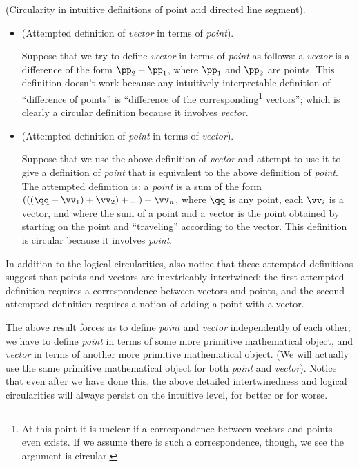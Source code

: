 \begin{remark}
    (Circularity in intuitive definitions of point and directed line segment).
        
    \begin{itemize}
        \item (Attempted definition of \textit{vector} in terms of \textit{point}). 
        
        Suppose that we try to define \textit{vector} in terms of \textit{point} as follows: a \textit{vector} is a difference of the form $\pp_2 - \pp_1$, where $\pp_1$ and $\pp_2$ are points. This definition doesn't work because any intuitively interpretable definition of ``difference of points'' is ``difference of the corresponding\footnote{At this point it is unclear if a correspondence between vectors and points even exists. If we assume there is such a correspondence, though, we see the argument is circular.} vectors''; which is clearly a circular definition because it involves \textit{vector}.
        
        \item (Attempted definition of \textit{point} in terms of \textit{vector}). 
        
        Suppose that we use the above definition of \textit{vector} and attempt to use it to give a definition of \textit{point} that is equivalent to the above definition of \textit{point}. The attempted definition is: a \textit{point} is a sum of the form $(((\qq + \vv_1) + \vv_2) + ...) + \vv_n$, where $\qq$ is any point, each $\vv_i$ is a vector, and where the sum of a point and a vector is the point obtained by starting on the point and ``traveling'' according to the vector. This definition is circular because it involves \textit{point}.
    \end{itemize}
    
    In addition to the logical circularities, also notice that these attempted definitions suggest that points and vectors are inextricably intertwined: the first attempted definition requires a correspondence between vectors and points, and the second attempted definition requires a notion of adding a point with a vector.
\end{remark}

The above result forces us to define \textit{point} and \textit{vector} independently of each other; we have to define \textit{point} in terms of some more primitive mathematical object, and \textit{vector} in terms of another more primitive mathematical object. (We will actually use the same primitive mathematical object for both \textit{point} and \textit{vector}). Notice that even after we have done this, the above detailed intertwinedness and logical circularities will always persist on the intuitive level, for better or for worse.

